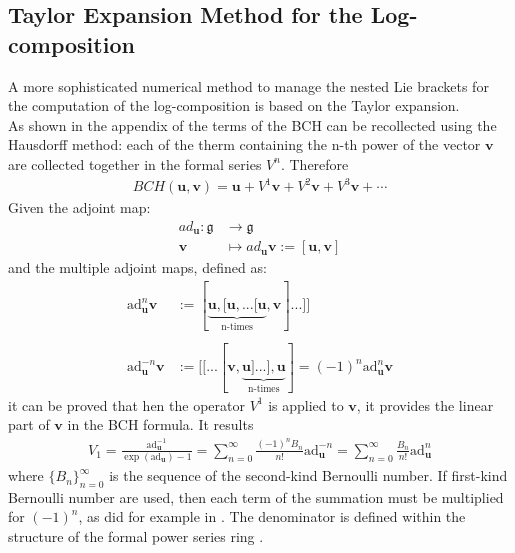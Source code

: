 \subsection{Taylor Expansion Method for the Log-composition}\label{se:taylor_expansion}

A more sophisticated numerical method to manage the nested Lie brackets for the computation of the log-composition is based on the Taylor expansion. \\
As shown in the appendix of \cite{klarsfeld1989baker} the terms of the BCH can be recollected using the Hausdorff method: each of the therm containing the n-th power of the vector $\mathbf{v}$ are collected together in the formal series $V^{n}$. Therefore
\begin{align*}
BCH(\mathbf{u},\mathbf{v}) 
= 
\mathbf{u} + V^{1} \mathbf{v} + V^{2} \mathbf{v} + V^{3} \mathbf{v} + \cdots
\end{align*}
Given the adjoint map:
\begin{align*}
ad_{\mathbf{u}} : \mathfrak{g}  & \longrightarrow \mathfrak{g}  
\\
\mathbf{v} &\longmapsto ad_{\mathbf{u}}   \mathbf{v} :=  [\mathbf{u}, \mathbf{v}]
\end{align*}
and the multiple adjoint maps, defined as:
\begin{align*}
\text{ad}_{\mathbf{u}}^{n} \mathbf{v} 
&:= [  \underbrace{   \mathbf{u},[\mathbf{u},... [\mathbf{u}}_{\text{n-times}},\mathbf{v}]...]] 
\\
\\
\text{ad}_{\mathbf{u}}^{-n} \mathbf{v} 
&:= [[...[  \mathbf{v}, \underbrace{   \mathbf{u}]...],\mathbf{u}}_{\text{n-times}}]
= (-1)^n \text{ad}_{\mathbf{u}}^{n} \mathbf{v} 
\end{align*}
it can be proved that hen the operator $V^{1}$ is applied to $\mathbf{v}$, it provides the linear part of $\mathbf{v}$ in the BCH formula. It results
\begin{align*}
V_{1}
= 
\frac{  
	\text{ad}_{\mathbf{u}}^{-1} 
	}{
	\exp{(\text{ad}_{\mathbf{u}})}-1
	}
=
\sum_{n=0}^{\infty} \frac{(-1)^nB_{n}}{n!} \text{ad}_{\mathbf{u}}^{ - n} 
=
\sum_{n=0}^{\infty} \frac{B_{n}}{n!} \text{ad}_{\mathbf{u}}^{ n} 
\end{align*}
where $\lbrace B_{n} \rbrace_{n=0}^{\infty} $ is the sequence of the second-kind Bernoulli number. If first-kind Bernoulli number are used, then each term of the summation must be multiplied for $(-1)^{n}$, as did for example in \cite{klarsfeld1989baker}. The denominator is defined within the structure of the formal power series ring \cite{mariconda2013calcolo}.\\
